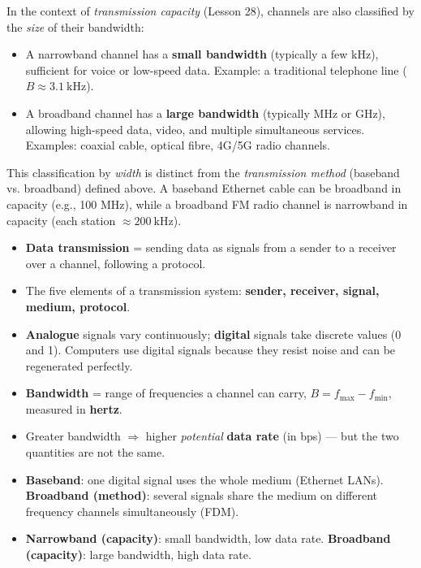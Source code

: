 \documentclass[11pt]{article}
\newcommand{\cle}[1]{{\popxbold\color{popdark}#1}}
\begin{document}
\begin{propriete}
In the context of \emph{transmission capacity} (Lesson 28), channels are also classified by the \emph{size} of their bandwidth:
\begin{itemize}
\item A \cle{narrowband} channel has a \textbf{small bandwidth} (typically a few kHz), sufficient for voice or low-speed data. Example: a traditional telephone line ($B \approx 3.1\ \mathrm{kHz}$).
\item A \cle{broadband} channel has a \textbf{large bandwidth} (typically MHz or GHz), allowing high-speed data, video, and multiple simultaneous services. Examples: coaxial cable, optical fibre, 4G/5G radio channels.
\end{itemize}
This classification by \emph{width} is distinct from the \emph{transmission method} (baseband vs. broadband) defined above. A baseband Ethernet cable can be broadband in capacity (e.g., 100 MHz), while a broadband FM radio channel is narrowband in capacity (each station $\approx 200\ \mathrm{kHz}$).
\end{propriete}

\begin{aretenir}
\begin{itemize}
\item \textbf{Data transmission} = sending data as signals from a sender to a receiver over a channel, following a protocol.
\item The five elements of a transmission system: \textbf{sender, receiver, signal, medium, protocol}.
\item \textbf{Analogue} signals vary continuously; \textbf{digital} signals take discrete values (0 and 1). Computers use digital signals because they resist noise and can be regenerated perfectly.
\item \textbf{Bandwidth} = range of frequencies a channel can carry, $B = f_{\max} - f_{\min}$, measured in \textbf{hertz}.
\item Greater bandwidth $\Rightarrow$ higher \emph{potential} \textbf{data rate} (in bps) — but the two quantities are not the same.
\item \textbf{Baseband}: one digital signal uses the whole medium (Ethernet LANs). \textbf{Broadband (method)}: several signals share the medium on different frequency channels simultaneously (FDM).
\item \textbf{Narrowband (capacity)}: small bandwidth, low data rate. \textbf{Broadband (capacity)}: large bandwidth, high data rate.
\end{itemize}
\end{aretenir}
\end{document}
